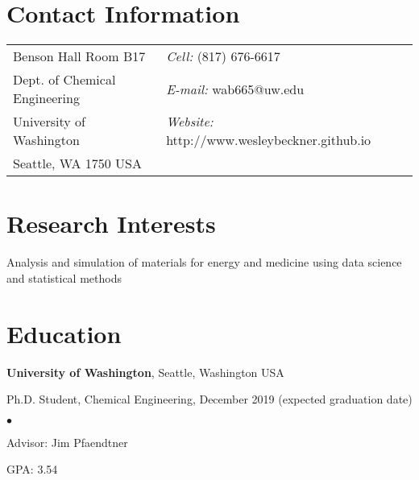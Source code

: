 \documentclass[margin,line]{res}
\newenvironment{list1}{
  \begin{list}{\ding{113}}{%
      \setlength{\itemsep}{0in}
      \setlength{\parsep}{0in} \setlength{\parskip}{0in}
      \setlength{\topsep}{0in} \setlength{\partopsep}{0in} 
      \setlength{\leftmargin}{0.17in}}}{\end{list}}
\newenvironment{list2}{
  \begin{list}{$\bullet$}{%
      \setlength{\itemsep}{0in}
      \setlength{\parsep}{0in} \setlength{\parskip}{0in}
      \setlength{\topsep}{0in} \setlength{\partopsep}{0in} 
      \setlength{\leftmargin}{0.2in}}}{\end{list}}
\begin{document}

\begin{resume}
\section{\sc Contact Information}
\vspace{.05in}
\begin{tabular}{@{}p{2in}p{4in}}
Benson Hall Room B17             & {\it Cell:}  (817) 676-6617 \\            
Dept. of Chemical Engineering & {\it E-mail:}  wab665@uw.edu \\          
University of Washington & {\it Website:} http://www.wesleybeckner.github.io \\
Seattle, WA 1750 USA  
\end{tabular}


\section{\sc Research Interests}
Analysis and simulation of materials for energy and medicine using data science and statistical methods

\section{\sc Education}
{\bf University of Washington}, Seattle, Washington USA\\
\vspace*{-.1in}
\begin{list1}
\item[] Ph.D. Student, Chemical Engineering, December 2019 (expected
  graduation date)
\begin{list2}
\vspace*{.05in}
\item Advisor:  Jim Pfaendtner
\item GPA: 3.54
\end{list2}
\end{list1}


\end{resume}
\end{document}
